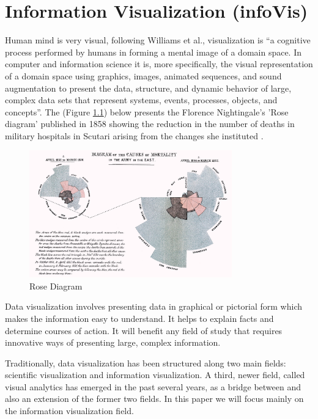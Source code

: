 \chapter{Information Visualization (infoVis)}

Human mind is very visual, following Williams et al., visualization is “a cognitive process performed by humans in forming a mental image of a domain space. In computer and information science it is, more specifically, the visual representation of a domain space using graphics, images, animated sequences, and sound augmentation to present the data, structure, and dynamic behavior of large, complex data sets that represent systems, events, processes, objects, and concepts”\cite{williamsVisualization1995}. The (Figure \ref{fig:roseDiagram}) below presents the Florence Nightingale's 'Rose diagram' published in 1858 showing the reduction in the number of deaths in military hospitals in Scutari arising from the changes she instituted\cite{spence2001information} .

\begin{figure}[h!]
    \center
    \includegraphics[width=0.78\textwidth]{images/chapter2/rose.jpg}
    \caption{Rose Diagram}
    \label{fig:roseDiagram}
  \end{figure}

 \newpage 
  Data visualization involves presenting data in graphical or pictorial form which makes the information easy to understand. It helps to explain facts and determine courses of action. It will benefit any field of study that requires innovative ways of presenting large, complex information\cite{spence2001information}.



  Traditionally, data visualization has been structured along two main fields: scientific visualization and information visualization. A third, newer field, called visual analytics has emerged in the past several years, as a bridge between and also an extension of the former two fields\cite{teleaDataVisualizationPrinciples2008}. In this paper we will focus mainly on the information visualization field.


